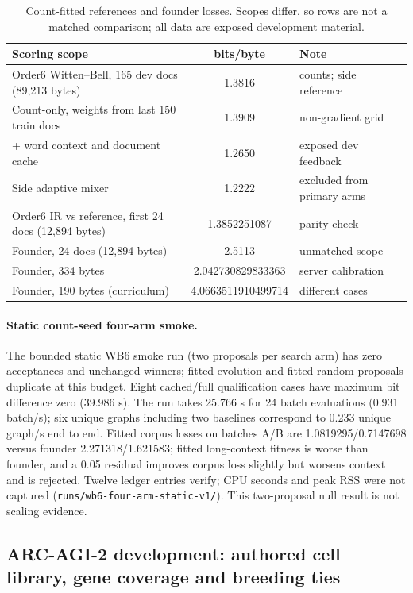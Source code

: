 \documentclass[11pt]{article}
\begin{document}
\begin{table}[!htbp]
\centering\small
\begin{tabular}{@{}lcl@{}}
\toprule
Scoring scope & bits/byte & Note\\
\midrule
Order6 Witten--Bell, 165 dev docs (89{,}213 bytes) & 1.3816 & counts; side reference\\
Count-only, weights from last 150 train docs & 1.3909 & non-gradient grid\\
+ word context and document cache & 1.2650 & exposed dev feedback\\
Side adaptive mixer & 1.2222 & excluded from primary arms\\
Order6 IR vs reference, first 24 docs (12{,}894 bytes) & 1.3852251087 & parity check\\
Founder, 24 docs (12{,}894 bytes) & 2.5113 & unmatched scope\\
Founder, 334 bytes & 2.042730829833363 & server calibration\\
Founder, 190 bytes (curriculum) & 4.0663511910499714 & different cases\\
\bottomrule
\end{tabular}
\caption{Count-fitted references and founder losses. Scopes differ, so rows are not a matched
comparison; all data are exposed development material.}
\label{tab:counts}
\end{table}

\paragraph{Static count-seed four-arm smoke.} The bounded static WB6 smoke run (two proposals per
search arm) has zero acceptances and unchanged winners; fitted-evolution and fitted-random
proposals duplicate at this budget. Eight cached/full qualification cases have maximum bit
difference zero (39.986 s). The run takes 25.766 s for 24 batch evaluations (0.931 batch/s); six
unique graphs including two baselines correspond to 0.233 unique graph/s end to end. Fitted corpus
losses on batches A/B are 1.0819295/0.7147698 versus founder 2.271318/1.621583; fitted
long-context fitness is worse than founder, and a 0.05 residual improves corpus loss slightly but
worsens context and is rejected. Twelve ledger entries verify; CPU seconds and peak RSS were not
captured (\texttt{runs/wb6-four-arm-static-v1/}). This two-proposal null result is not scaling
evidence.

\subsection{ARC-AGI-2 development: authored cell library, gene coverage and breeding ties}\label{sec:arc}
\end{document}
